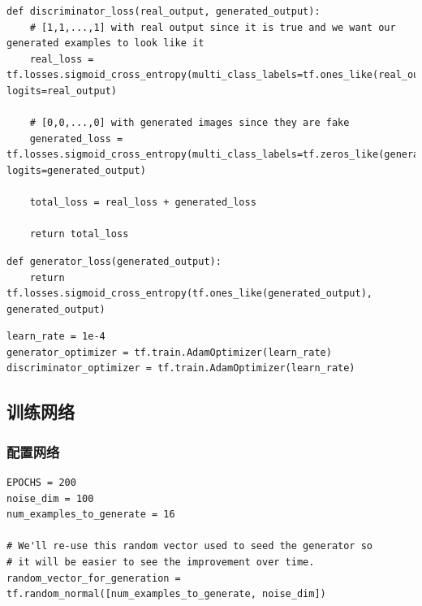 \documentclass[a4paper, 12pt]{article}
\begin{document}
\begin{lstlisting}[style=myPython,caption={判别器损失函数}]
def discriminator_loss(real_output, generated_output):
    # [1,1,...,1] with real output since it is true and we want our generated examples to look like it
    real_loss = tf.losses.sigmoid_cross_entropy(multi_class_labels=tf.ones_like(real_output), logits=real_output)

    # [0,0,...,0] with generated images since they are fake
    generated_loss = tf.losses.sigmoid_cross_entropy(multi_class_labels=tf.zeros_like(generated_output), logits=generated_output)

    total_loss = real_loss + generated_loss

    return total_loss
\end{lstlisting}

\begin{lstlisting}[style=myPython,caption={生成器损失函数}]
def generator_loss(generated_output):
    return tf.losses.sigmoid_cross_entropy(tf.ones_like(generated_output), generated_output)
\end{lstlisting}


\begin{lstlisting}[style=myPython,caption={生成器损失函数}]
learn_rate = 1e-4
generator_optimizer = tf.train.AdamOptimizer(learn_rate)
discriminator_optimizer = tf.train.AdamOptimizer(learn_rate)
\end{lstlisting}

\subsection{训练网络}

\subsubsection{配置网络}

\begin{lstlisting}[style=myPython,caption={配置网络参数}]
EPOCHS = 200
noise_dim = 100
num_examples_to_generate = 16

# We'll re-use this random vector used to seed the generator so
# it will be easier to see the improvement over time.
random_vector_for_generation = tf.random_normal([num_examples_to_generate, noise_dim])
\end{lstlisting}
\end{document}
